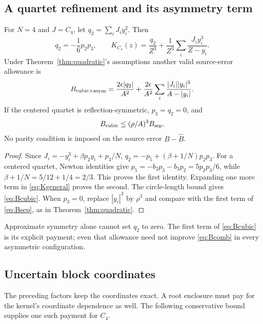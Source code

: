\subsection{A quartet refinement and its asymmetry term}
\begin{proposition}
\label{prop:cubic}
For $N=4$ and $J=C_4$, let $q_2=\sum_iJ_i y_i^2$. Then
\begin{equation}
 q_2=-\frac16p_2p_3,\qquad
 K_{C_4}(z)=\frac{q_2}{Z^3}
          +\frac1{Z^3}\sum_i\frac{J_i y_i^3}{Z-y_i}.
 \label{eq:cubic-kernel}
\end{equation}
Under Theorem~\ref{thm:quadratic}'s assumptions another valid
source-error allowance is
\begin{equation}
 B_{\rm cubic+asym}=\frac{2\epsilon|q_2|}{A^2}
       +\frac{2\epsilon}{A^2}
             \sum_i\frac{|J_i||y_i|^3}{A-|y_i|}.
 \label{eq:Bcubic}
\end{equation}
If the centered quartet is reflection-symmetric, $p_3=q_2=0$,
and
\begin{equation}
 B_{\rm cubic}\le(\rho/A)^3 B_{\rm sep}.
 \label{eq:cubic-factor}
\end{equation}
No parity condition is imposed on the source error $B-\widehat B$.
\end{proposition}
\begin{proof}
Since $J_i=-y_i^3+\beta p_2y_i+p_3/N$,
$q_2=-p_5+(\beta+1/N)p_2p_3$. For a centered quartet,
Newton identities give
$p_5=-b_2p_3-b_3p_2=5p_2p_3/6$, while
$\beta+1/N=5/12+1/4=2/3$. This proves the first identity.
Expanding one more term in \eqref{eq:Kgeneral} proves the second.
The circle-length bound gives \eqref{eq:Bcubic}. When $p_3=0$,
replace $|y_i|^3$ by $\rho^3$ and compare with the first term of
\eqref{eq:Bsep}, as in Theorem~\ref{thm:quadratic}.
\end{proof}

Approximate symmetry alone cannot set $q_2$ to zero. The first
term of \eqref{eq:Bcubic} is its explicit payment; even that
allowance need not improve \eqref{eq:Bcomb} in every asymmetric
configuration.

\subsection{Uncertain block coordinates}
The preceding factors keep the coordinates exact. A root enclosure
must pay for the kernel's coordinate dependence as well. The
following conservative bound supplies one such payment for $C_4$.


